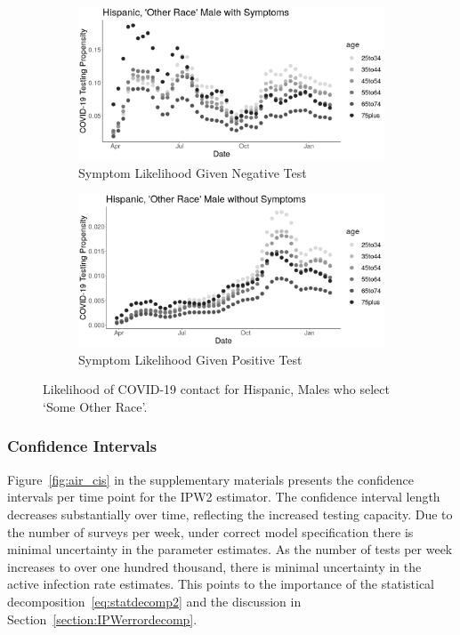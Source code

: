 \documentclass[11pt]{amsart}
\numberwithin{equation}{section}
\theoremstyle{plain}
\begin{document}
\begin{figure}[!th]
\centering
\begin{subfigure}{.5\textwidth}
 \centering
 \includegraphics[width=.9\linewidth]{../figs/tvprop_alt_fig1_supp3.png}
 \caption{Symptom Likelihood Given Negative Test}
\end{subfigure}%
\begin{subfigure}{.5\textwidth}
 \centering
\includegraphics[width=.9\linewidth]{../figs/tvprop_alt_fig2_supp3.png}
 \caption{Symptom Likelihood Given Positive Test}
\end{subfigure}
\caption{Likelihood of COVID-19 contact for Hispanic, Males who select `Some Other Race'.}
\label{fig:h-other-male}
\end{figure}



\newpage
\subsubsection{Confidence Intervals}


Figure~\ref{fig:air_cis} in the supplementary materials presents the confidence intervals per time point for the IPW2 estimator.  The confidence interval length decreases substantially over time, reflecting the increased testing capacity.  Due to the number of surveys per week, under correct model specification there is minimal uncertainty in the parameter estimates.  As the number of tests per week increases to over one hundred thousand, there is minimal uncertainty in the active infection rate estimates. This points to the importance of the statistical decomposition~\eqref{eq:statdecomp2} and the discussion in Section~\ref{section:IPWerrordecomp}.
\end{document}
